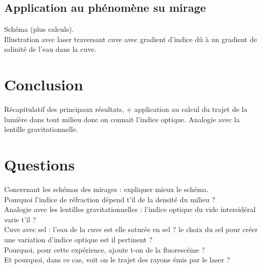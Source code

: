 \documentclass[12pt,prb,aps,epsf]{report}
\begin{document}
\subsection{Application au phénomène su mirage}
Schéma (plus calculs).\\
Illustration avec laser traversant cuve avec gradient d'indice dû à un gradient de salinité de l'eau dans la cuve.

\section{Conclusion}
Récapitulatif des principaux résultats, + application au calcul du trajet de la lumière dans tout milieu donc on connait l'indice optique. Analogie avec la lentille gravitationnelle.

\section{Questions}
Concernant les schémas des mirages : expliquer mieux le schéma.\\

Pourquoi l'indice de réfraction dépend t'il de la densité du milieu ?\\

Analogie avec les lentilles gravitationnelles :  l'indice optique du vide intersidéral varie t'il ? \\

Cuve avec sel : l'eau de la cuve est elle saturée en sel ? le choix du sel pour créer une variation d'indice optique est il pertinent ?\\

Pourquoi, pour cette expérience, ajoute t-on de la fluorescéine ?\\

Et pourquoi, dans ce cas, voit on le trajet des rayons émis par le laser ?
\end{document}
